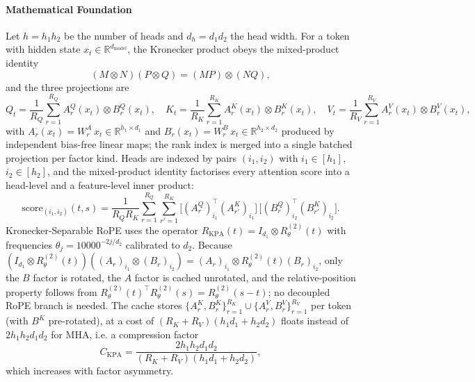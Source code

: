 \paragraph{Mathematical Foundation}
Let $h = h_1 h_2$ be the number of heads and $d_h = d_1 d_2$ the head width. For a token with hidden state $x_t \in \mathbb{R}^{d_{\text{model}}}$, the Kronecker product obeys the mixed-product identity
\[
(M \otimes N)(P \otimes Q) = (MP) \otimes (NQ),
\]
and the three projections are
\[
Q_t = \frac{1}{R_Q}\sum_{r=1}^{R_Q} A^Q_r(x_t)\otimes B^Q_r(x_t),\quad
K_t = \frac{1}{R_K}\sum_{r=1}^{R_K} A^K_r(x_t)\otimes B^K_r(x_t),\quad
V_t = \frac{1}{R_V}\sum_{r=1}^{R_V} A^V_r(x_t)\otimes B^V_r(x_t),
\]
with $A^\cdot_r(x_t) = W^{A^\cdot}_r x_t \in \mathbb{R}^{h_1\times d_1}$ and $B^\cdot_r(x_t) = W^{B^\cdot}_r x_t \in \mathbb{R}^{h_2\times d_2}$ produced by independent bias-free linear maps; the rank index is merged into a single batched projection per factor kind. Heads are indexed by pairs $(i_1,i_2)$ with $i_1\in[h_1]$, $i_2\in[h_2]$, and the mixed-product identity factorises every attention score into a head-level and a feature-level inner product:
\[
\mathrm{score}_{(i_1,i_2)}(t,s) = \frac{1}{R_Q R_K}\sum_{r=1}^{R_Q}\sum_{r'=1}^{R_K}
\bigl[(A^Q_r)_{i_1}^{\top}(A^K_{r'})_{i_1}\bigr]\,
\bigl[(B^Q_r)_{i_2}^{\top}(B^K_{r'})_{i_2}\bigr].
\]
Kronecker-Separable RoPE uses the operator $R_{\mathrm{KPA}}(t) = I_{d_1}\otimes R^{(2)}_\theta(t)$ with frequencies $\theta_j = 10000^{-2j/d_2}$ calibrated to $d_2$. Because $(I_{d_1}\otimes R^{(2)}_\theta(t))((A_r)_{i_1}\otimes(B_r)_{i_2}) = (A_r)_{i_1}\otimes R^{(2)}_\theta(t)(B_r)_{i_2}$, only the $B$ factor is rotated, the $A$ factor is cached unrotated, and the relative-position property follows from $R^{(2)}_\theta(t)^{\top}R^{(2)}_\theta(s) = R^{(2)}_\theta(s-t)$; no decoupled RoPE branch is needed.
The cache stores $\{A^K_r, B^K_r\}_{r=1}^{R_K}\cup\{A^V_r, B^V_r\}_{r=1}^{R_V}$ per token (with $B^K$ pre-rotated), at a cost of $(R_K+R_V)(h_1d_1+h_2d_2)$ floats instead of $2h_1h_2d_1d_2$ for MHA, i.e. a compression factor
\[
C_{\mathrm{KPA}} = \frac{2h_1h_2d_1d_2}{(R_K+R_V)(h_1d_1+h_2d_2)},
\]
which increases with factor asymmetry.


